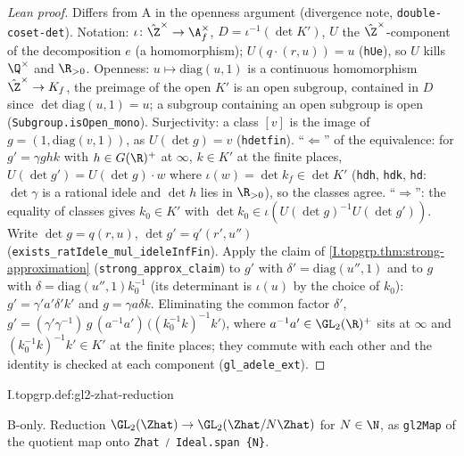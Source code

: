 \begin{proof}[Lean proof]
Differs from A in the openness argument (divergence note, \texttt{double-coset-det}). Notation: $\iota\colon\hat\Z^\times\to\A_f^\times$, $D=\iota^{-1}(\det K')$, $U$ the $\hat\Z^\times$-component of the decomposition $e$ (a homomorphism); $U(q\cdot(r,u))=u$ (\texttt{hUe}), so $U$ kills $\Q^\times$ and $\R_{>0}$. Openness: $u\mapsto\mathrm{diag}(u,1)$ is a continuous homomorphism $\hat\Z^\times\to K_f$, the preimage of the open $K'$ is an open subgroup, contained in $D$ since $\det\mathrm{diag}(u,1)=u$; a subgroup containing an open subgroup is open (\texttt{Subgroup.isOpen\_mono}). Surjectivity: a class $[v]$ is the image of $g=(1,\mathrm{diag}(v,1))$, as $U(\det g)=v$ (\texttt{hdetfin}). ``$\Leftarrow$'' of the equivalence: for $g'=\gamma g h k$ with $h\in G(\R)^+$ at $\infty$, $k\in K'$ at the finite places, $U(\det g')=U(\det g)\cdot w$ where $\iota(w)=\det k_f\in\det K'$ (\texttt{hdh}, \texttt{hdk}, \texttt{hd\gamma}: $\det\gamma$ is a rational idele and $\det h$ lies in $\R_{>0}$), so the classes agree. ``$\Rightarrow$'': the equality of classes gives $k_0\in K'$ with $\det k_0\in\iota(U(\det g)^{-1}U(\det g'))$. Write $\det g=q(r,u)$, $\det g'=q'(r',u'')$ (\texttt{exists\_ratIdele\_mul\_ideleInfFin}). Apply the claim of \cref{I.topgrp.thm:strong-approximation} (\texttt{strong\_approx\_claim}) to $g'$ with $\delta'=\mathrm{diag}(u'',1)$ and to $g$ with $\delta=\mathrm{diag}(u'',1)k_0^{-1}$ (its determinant is $\iota(u)$ by the choice of $k_0$): $g'=\gamma'a'\delta'k'$ and $g=\gamma a\delta k$. Eliminating the common factor $\delta'$, $g'=(\gamma'\gamma^{-1})\,g\,(a^{-1}a')\,\bigl((k_0^{-1}k)^{-1}k'\bigr)$, where $a^{-1}a'\in\GL_2(\R)^+$ sits at $\infty$ and $(k_0^{-1}k)^{-1}k'\in K'$ at the finite places; they commute with each other and the identity is checked at each component (\texttt{gl\_adele\_ext}).
\end{proof}


\begin{definition}
\bonly
{}
\end{definition}
\begin{tfformal}{I.topgrp.def:gl2-zhat-reduction}
\begin{tffidelity}
B-only. Reduction $\GL_2(\Zhat)\to\GL_2(\Zhat/N\Zhat)$ for $N\in\N$, as \texttt{gl2Map} of the quotient map onto \texttt{Zhat ⧸ Ideal.span \{N\}}.
\end{tffidelity}
\end{tfformal}

